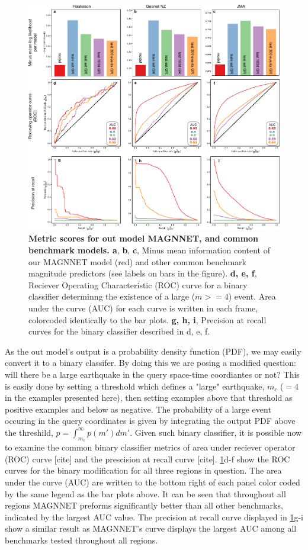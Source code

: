 \documentclass[pdflatex]{sn-jnl}
\begin{document}
\begin{figure}[h!]
    \centering
    \includegraphics[width=1\textwidth]{figures/combined_batplots.pdf}
    \caption{
        \textbf{Metric scores for out model MAGNNET, and common benchmark models. a}, \textbf{b}, \textbf{c}, Minus mean information content of our MAGNNET model (red) and other common benchmark magnitude predictors (see labels on bars in the figure). \textbf{d, e, f}, Reciever Operating Characteristic (ROC) curve for a binary classifier determinng the existence of a large ($m>=4$) event. Area under the curve (AUC) for each curve is written in each frame, colorcoded identically to the bar plots. \textbf{g, h, i}, Precision at recall curves for the binary classifier described in d, e, f. 
        }
        \label{fig:metrics}
\end{figure}

As the out model's output is a probability density function (PDF), we may easily convert it to a binary classifer. By doing this we are posing a modified question: will there be a large earthquake in the query space-time coordiantes or not? This is easily done by setting a threshold which defines a "large" earthquake, $m_c$ ($=4$ in the examples presented here), then setting examples above that threshold as positive examples and below as negative. The probability of a large event occuring in the query coordinates is given by integrating the output PDF above the threshild, $p=\int_{m_c}^{\infty}p(m')dm'$. Given such binary classifier, it is possible now to examine the common binary classifier metrics of area under reciever operator (ROC) curve [cite] and the prescision at recall curve [cite]. \ref{fig:metrics}d-f show the ROC curves for the binary modification for all three regions in question. The area under the curve (AUC) are written to the bottom right of each panel color coded by the same legend as the bar plots above. It can be seen that throughout all regions MAGNNET preforms significantly better than all other benchmarks, indicated by the largest AUC value. The precision at recall curve displayed in \ref{fig:metrics}g-i show a similar result as MAGNNET's curve displays the largest AUC among all benchmarks tested throughout all regions.
\end{document}
